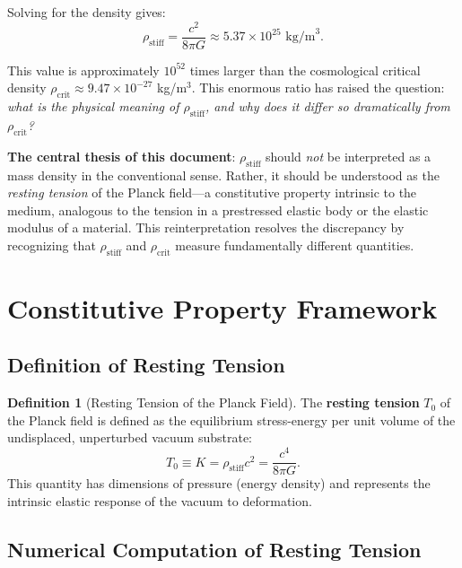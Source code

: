 \documentclass[11pt,a4paper]{article}
\newcommand{\rhocrit}{\ensuremath{\rho_{\mathrm{crit}}}}
\newcommand{\rhostiff}{\ensuremath{\rho_{\mathrm{stiff}}}}
\newcommand{\Tzero}{\ensuremath{T_0}}
\theoremstyle{definition}
\newtheorem{definition}{Definition}
\begin{document}
Solving for the density gives:
\begin{equation}
\label{eq:rho_stiff_intro}
\rhostiff = \frac{c^2}{8\pi G} \approx 5.37 \times 10^{25} \text{ kg/m}^3.
\end{equation}

This value is approximately $10^{52}$ times larger than the cosmological critical density $\rhocrit \approx 9.47 \times 10^{-27}$ kg/m$^3$. This enormous ratio has raised the question: \emph{what is the physical meaning of $\rhostiff$, and why does it differ so dramatically from $\rhocrit$?}

\textbf{The central thesis of this document}: $\rhostiff$ should \emph{not} be interpreted as a mass density in the conventional sense. Rather, it should be understood as the \emph{resting tension} of the Planck field---a constitutive property intrinsic to the medium, analogous to the tension in a prestressed elastic body or the elastic modulus of a material. This reinterpretation resolves the discrepancy by recognizing that $\rhostiff$ and $\rhocrit$ measure fundamentally different quantities.

\section{Constitutive Property Framework}
\label{sec:constitutive}

\subsection{Definition of Resting Tension}
\label{sec:resting_tension_def}

\begin{definition}[Resting Tension of the Planck Field]
\label{def:resting_tension}
The \textbf{resting tension} $\Tzero$ of the Planck field is defined as the equilibrium stress-energy per unit volume of the undisplaced, unperturbed vacuum substrate:
\begin{equation}
\label{eq:T0_definition}
\boxed{\Tzero \equiv K = \rhostiff c^2 = \frac{c^4}{8\pi G}.}
\end{equation}
This quantity has dimensions of pressure (energy density) and represents the intrinsic elastic response of the vacuum to deformation.
\end{definition}

\subsection{Numerical Computation of Resting Tension}
\label{sec:T0_numerical}
\end{document}

